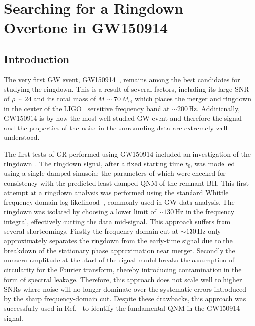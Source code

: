 

\chapter{Searching for a Ringdown Overtone in GW150914}

\label{Chapter4}

\section{Introduction}\label{ch4:sec:introduction}

The very first GW event, GW150914~\cite{LIGOScientific:2016aoc}, remains among the best candidates for studying the ringdown.
This is a result of several factors, including its large SNR of $\rho\sim 24$ and its total mass of $M\sim 70\,M_\odot$ which places the merger and ringdown in the center of the LIGO~\cite{LIGOScientific:2014pky} sensitive frequency band at $\sim 200\,\mathrm{Hz}$. 
Additionally, GW150914 is by now the most well-studied GW event and therefore the signal and the properties of the noise in the surrounding data are extremely well understood.

The first tests of GR performed using GW150914 included an investigation of the ringdown~\cite{LIGOScientific:2016lio}. 
The ringdown signal, after a fixed starting time $t_0$, was modelled using a single damped sinusoid; the parameters of which were checked for consistency with the predicted least-damped QNM of the remnant BH.
This first attempt at a ringdown analysis was performed using the standard Whittle frequency-domain log-likelihood~\cite{10.2307/2983994}, commonly used in GW data analysis.
The ringdown was isolated by choosing a lower limit of $\sim 130\, \mathrm{Hz}$ in the frequency integral, effectively cutting the data mid-signal.
This approach suffers from several shortcomings. 
Firstly the frequency-domain cut at $\sim 130\, \mathrm{Hz}$ only approximately separates the ringdown from the early-time signal due to the breakdown of the stationary phase approximation near merger. 
Secondly the nonzero amplitude at the start of the signal model breaks the assumption of circularity for the Fourier transform, thereby introducing contamination in the form of spectral leakage. 
Therefore, this approach does not scale well to higher SNRs where noise will no longer dominate over the systematic errors introduced by the sharp frequency-domain cut.
Despite these drawbacks, this approach was successfully used in Ref.~\cite{LIGOScientific:2016lio} to identify the fundamental QNM in the GW150914 signal.

